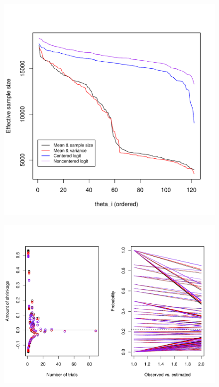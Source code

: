 \documentclass[12pt, oneside, titlepage]{article}   	%
\begin{document}
 \begin{figure}[h]
   \centering
       \includegraphics[page=1,width=.9\textwidth]{../../figures/appendix/appendix-1/neff}              
    \caption{   }
 \label{fig:...}
\end{figure}

 \begin{figure}[h]
   \centering
       \includegraphics[page=1,width=.75\textwidth]{../../figures/appendix/appendix-1/shrinkageSamplesize}              
    \caption{   }
 \label{fig:...}
\end{figure}
\end{document}

